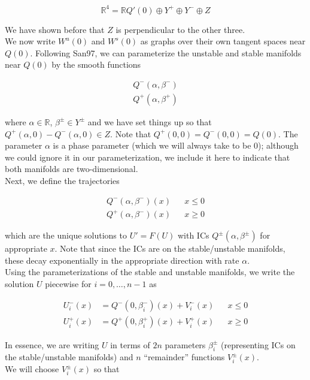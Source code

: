 \documentclass[12pt]{article}
\def\R{{\mathbb R}}
\begin{document}
\[
\R^4 = \R Q'(0) \oplus Y^+ \oplus Y^- \oplus Z
\]
 
We have shown before that $Z$ is perpendicular to the other three. \\

We now write $W^u(0)$ and $W^s(0)$ as graphs over their own tangent spaces near $Q(0)$. Following San97, we can parameterize the unstable and stable manifolds near $Q(0)$ by the smooth functions

\begin{align*}
Q^-(\alpha, \beta^-) \\
Q^+(\alpha, \beta^+)
\end{align*}

where $\alpha \in \R$, $\beta^\pm \in Y^\pm$ and we have set things up so that $Q^+(\alpha, 0) - Q^-(\alpha, 0) \in Z$. Note that $Q^+(0, 0) = Q^-(0, 0) = Q(0)$. The parameter $\alpha$ is a phase parameter (which we will always take to be 0); although we could ignore it in our parameterization, we include it here to indicate that both manifolds are two-dimensional. \\

Next, we define the trajectories

\begin{align*}
Q^-(\alpha, \beta^-)(x) && x \leq 0 \\
Q^+(\alpha, \beta^-)(x) && x \geq 0
\end{align*}

which are the unique solutions to $U' = F(U)$ with ICs $Q^\pm(\alpha, \beta^\pm)$ for appropriate $x$. Note that since the ICs are on the stable/unstable manifolds, these decay exponentially in the appropriate direction with rate $\alpha$.\\

Using the parameterizations of the stable and unstable manifolds, we write the solution $U$ piecewise for $i = 0, \dots, n-1$ as

\begin{align*}
U_i^-(x) &= Q^-(0, \beta_i^-)(x) + V_i^-(x) && x \leq 0 \\
U_i^+(x) &= Q^+(0, \beta_i^+)(x) + V_i^+(x) && x \geq 0
\end{align*}

In essence, we are writing $U$ in terms of $2n$ parameters $\beta_i^\pm$ (representing ICs on the stable/unstable manifolds) and $n$ ``remainder'' functions $V_i^\pm(x)$.\\

We will choose $V_i^\pm(x)$ so that
\end{document}
